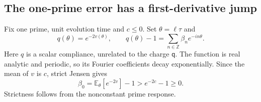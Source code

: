 \documentclass[11pt]{article}
\numberwithin{equation}{section}
\theoremstyle{definition}
\theoremstyle{remark}
\newcommand{\qq}{\mathsf q}
\newcommand{\avg}[1]{\mathbb E_{\theta}\!\left[#1\right]}
\begin{document}
\subsection{The one-prime error has a first-derivative jump}
Fix one prime, unit evolution time and $c\le0$. Set $\theta=\ell\tau$ and
\begin{equation}
 q(\theta)=e^{-2v(\theta)},\qquad
 q(\theta)-1=\sum_{n\in\mathbb Z}\beta_ne^{-in\theta}.
 \label{eq:qbeta}
\end{equation}
Here $q$ is a scalar compliance, unrelated to the charge $\qq$. The function is real analytic and periodic, so its Fourier coefficients decay exponentially. Since the mean of $v$ is $c$, strict Jensen gives
\begin{equation}
 \beta_0=\avg{e^{-2v}}-1>e^{-2c}-1\ge0.
 \label{eq:beta0}
\end{equation}
Strictness follows from the nonconstant prime response.
\end{document}
